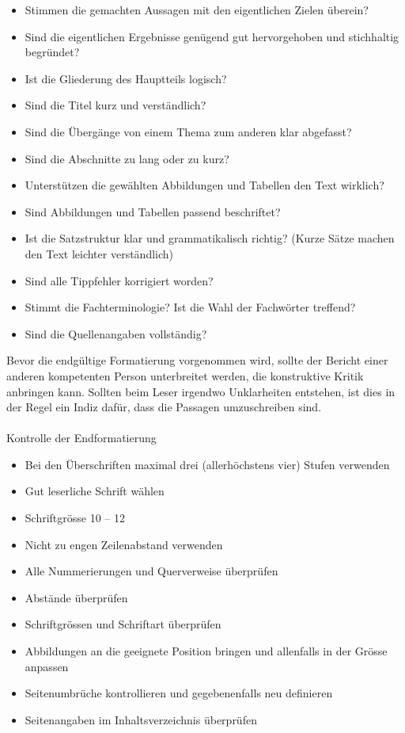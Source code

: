 \documentclass[
]{agujournal2019}
\makeatletter
\let\oldparagraph\paragraph
\renewcommand{\paragraph}{
    \@ifstar
      \xxxParagraphStar
      \xxxParagraphNoStar
  }
\newcommand{\xxxParagraphStar}[1]{\oldparagraph*{#1}\mbox{}}
\newcommand{\xxxParagraphNoStar}[1]{\oldparagraph{#1}\mbox{}}
\makeatother
\begin{document}
\begin{itemize}
\item
  Stimmen die gemachten Aussagen mit den eigentlichen Zielen überein?
\item
  Sind die eigentlichen Ergebnisse genügend gut hervorgehoben und
  stichhaltig begründet?
\item
  Ist die Gliederung des Hauptteils logisch?
\item
  Sind die Titel kurz und verständlich?
\item
  Sind die Übergänge von einem Thema zum anderen klar abgefasst?
\item
  Sind die Abschnitte zu lang oder zu kurz?
\item
  Unterstützen die gewählten Abbildungen und Tabellen den Text wirklich?
\item
  Sind Abbildungen und Tabellen passend beschriftet?
\item
  Ist die Satzstruktur klar und grammatikalisch richtig? (Kurze Sätze
  machen den Text leichter verständlich)
\item
  Sind alle Tippfehler korrigiert worden?
\item
  Stimmt die Fachterminologie? Ist die Wahl der Fachwörter treffend?
\item
  Sind die Quellenangaben vollständig?
\end{itemize}

Bevor die endgültige Formatierung vorgenommen wird, sollte der Bericht
einer anderen kompetenten Person unterbreitet werden, die konstruktive
Kritik anbringen kann. Sollten beim Leser irgendwo Unklarheiten
entstehen, ist dies in der Regel ein Indiz dafür, dass die Passagen
umzuschreiben sind.

\paragraph{Kontrolle der
Endformatierung}\label{kontrolle-der-endformatierung}

\begin{itemize}
\item
  Bei den Überschriften maximal drei (allerhöchstens vier) Stufen
  verwenden
\item
  Gut leserliche Schrift wählen
\item
  Schriftgrösse 10 -- 12
\item
  Nicht zu engen Zeilenabstand verwenden
\item
  Alle Nummerierungen und Querverweise überprüfen
\item
  Abstände überprüfen
\item
  Schriftgrössen und Schriftart überprüfen
\item
  Abbildungen an die geeignete Position bringen und allenfalls in der
  Grösse anpassen
\item
  Seitenumbrüche kontrollieren und gegebenenfalls neu definieren
\item
  Seitenangaben im Inhaltsverzeichnis überprüfen
\end{itemize}
\end{document}
